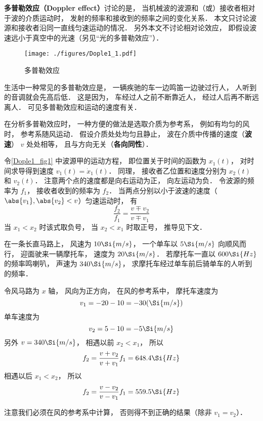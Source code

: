 

\textbf{多普勒效应（Doppler effect）}讨论的是， 当机械波的波源和（或）接收者相对于波的介质运动时， 发射的频率和接收到的频率之间的变化关系． 本文只讨论波源和接收者沿同一直线匀速运动的情况． 另外本文不讨论相对论效应， 即假设波速远小于真空中的光速（另见“光的多普勒效应”）．

\begin{figure}[ht]
\centering
\texttt{[image: ./figures/Dople1\_1.pdf]}
\caption{多普勒效应} \label{Dople1_fig1}
\end{figure}

\begin{example}{}
生活中一种常见的多普勒效应是， 一辆疾驰的车一边鸣笛一边驶过行人， 人听到的音调就会先高后低． 这是因为， 车经过人之前不断靠近人， 经过人后再不断远离人． 可见多普勒效应和运动的速度有关．
\end{example}

在分析多普勒效应时， 一种方便的做法是选取介质为参考系， 例如有均匀的风时， 参考系随风运动． 假设介质处处均匀且静止， 波在介质中传播的速度（\textbf{波速}） $v$ 处处相等， 且与方向无关（\textbf{各向同性}）．

令\autoref{Dople1_fig1} 中波源甲的运动方程， 即位置关于时间的函数为 $x_1(t)$， 对时间求导得到速度 $v_1(t) = \dot{x}_1(t)$． 同理， 接收者乙位置和速度分别为 $x_2(t)$ 和 $v_2(t)$． 注意两个点的速度都是向右运动为正， 向左运动为负． 令波源的频率为 $f_1$， 接收者收到的频率为 $f_2$． 当两点分别以小于波速的速度（$\abs{v_1}, \abs{v_2} < v$）匀速运动时， 有
\begin{equation}\label{Dople1_eq1}
\frac{f_2}{f_1} = \frac{v \mp v_2}{v \mp v_1}
\end{equation}
当 $x_1 < x_2$ 时该式取负号， 当 $x_2 < x_1$ 时取正号， 推导见下文．

\begin{exercise}{}
在一条长直马路上， 风速为 $10\Si{m/s}$， 一个单车以 $5\Si{m/s}$ 向顺风而行， 迎面驶来一辆摩托车， 速度为 $20\Si{m/s}$． 若摩托车一直以 $600\Si{Hz}$ 的频率鸣喇叭， 声速为 $340\Si{m/s}$， 求摩托车经过单车前后骑单车的人听到的频率．

令风马路为 $x$ 轴， 风向为正方向， 在风的参考系中， 摩托车速度为
\begin{equation}
v_1 = -20 - 10 = -30(\Si{m/s})
\end{equation}
单车速度为
\begin{equation}
v_2 = 5 - 10 = -5\Si{m/s}
\end{equation}
另外 $v = 340\Si{m/s}$， 相遇以前 $x_2 < x_1$， 所以
\begin{equation}
f_2 = \frac{v + v_2}{v + v_1} f_1 = 648.4\Si{Hz}
\end{equation}
相遇以后 $x_1 < x_2$， 所以
\begin{equation}
f_2 = \frac{v - v_2}{v - v_1} f_1 = 559.5\Si{Hz}
\end{equation}
\end{exercise}
注意我们必须在风的参考系中计算， 否则得不到正确的结果（除非 $v_1 = v_2$）．

